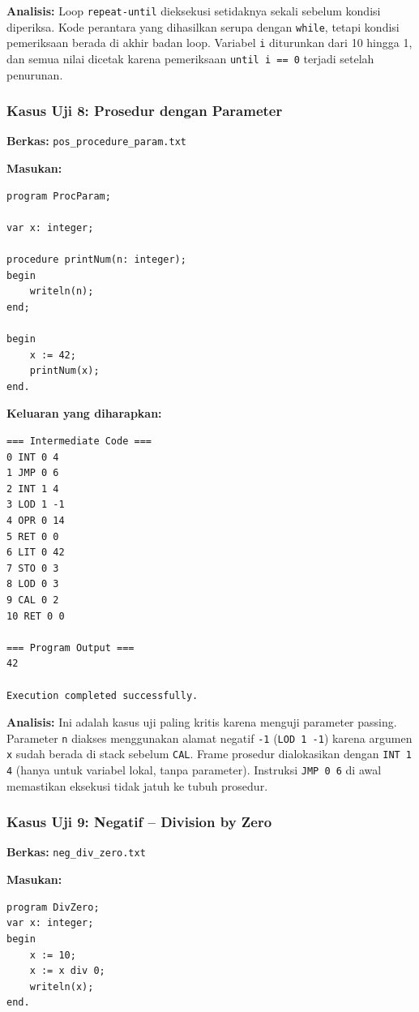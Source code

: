 \documentclass[12pt,a4paper]{article}
\begin{document}
\textbf{Analisis:} Loop \texttt{repeat-until} dieksekusi setidaknya sekali sebelum kondisi diperiksa. Kode perantara yang dihasilkan serupa dengan \texttt{while}, tetapi kondisi pemeriksaan berada di akhir badan loop. Variabel \texttt{i} diturunkan dari 10 hingga 1, dan semua nilai dicetak karena pemeriksaan \texttt{until i == 0} terjadi setelah penurunan.

\subsubsection{Kasus Uji 8: Prosedur dengan Parameter}

\textbf{Berkas:} \texttt{pos\_procedure\_param.txt}

\textbf{Masukan:}
\begin{lstlisting}
program ProcParam;

var x: integer;

procedure printNum(n: integer);
begin
    writeln(n);
end;

begin
    x := 42;
    printNum(x);
end.
\end{lstlisting}

\textbf{Keluaran yang diharapkan:}
\begin{verbatim}
=== Intermediate Code ===
0 INT 0 4
1 JMP 0 6
2 INT 1 4
3 LOD 1 -1
4 OPR 0 14
5 RET 0 0
6 LIT 0 42
7 STO 0 3
8 LOD 0 3
9 CAL 0 2
10 RET 0 0

=== Program Output ===
42

Execution completed successfully.
\end{verbatim}

\textbf{Analisis:} Ini adalah kasus uji paling kritis karena menguji parameter passing. Parameter \texttt{n} diakses menggunakan alamat negatif \texttt{-1} (\texttt{LOD 1 -1}) karena argumen \texttt{x} sudah berada di stack sebelum \texttt{CAL}. Frame prosedur dialokasikan dengan \texttt{INT 1 4} (hanya untuk variabel lokal, tanpa parameter). Instruksi \texttt{JMP 0 6} di awal memastikan eksekusi tidak jatuh ke tubuh prosedur.

\subsubsection{Kasus Uji 9: Negatif -- Division by Zero}

\textbf{Berkas:} \texttt{neg\_div\_zero.txt}

\textbf{Masukan:}
\begin{lstlisting}
program DivZero;
var x: integer;
begin
    x := 10;
    x := x div 0;
    writeln(x);
end.
\end{lstlisting}
\end{document}
